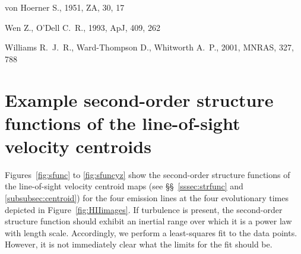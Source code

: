 \documentclass[useAMS,usenatbib]{mn2e}
\providecommand{\DIFadd}[1]{{\protect\color{red!70!black}#1}} %
\providecommand{\DIFaddbegin}{\color{red!70!black}} %
\providecommand{\DIFaddend}{\color{black}} %
\begin{document}
\begin{thebibliography}{}
von Hoerner S., 1951, ZA, 30, 17 

 Wen Z., O'Dell C.~R., 1993, ApJ, 409, 262 

 Williams R.~J.~R., Ward-Thompson D., Whitworth A.~P., 2001, MNRAS, 327, 788 








\end{thebibliography}

\DIFaddbegin \appendix
\DIFaddend 

\DIFaddbegin \section[]{\DIFadd{Example second-order structure functions of the line-of-sight velocity centroids}}
\label{app:sf}
\DIFadd{Figures~\ref{fig:sfunc} to \ref{fig:sfuncyz} show the second-order
structure functions of the line-of-sight velocity centroid maps (see
\S\S~\ref{sssec:strfunc} and \ref{subsubsec:centroid}) for the four
emission lines at the four evolutionary times depicted in
Figure~\ref{fig:HIIimages}.  If turbulence is present, the
second-order structure function should exhibit an inertial range over
which it is a power law with length scale. Accordingly, we perform a
least-squares fit to the data points. However, it is not immediately
clear what the limits for the fit should be. 
}
\end{document}
